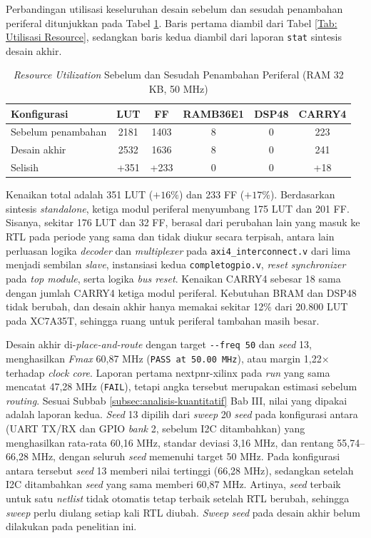 Perbandingan utilisasi keseluruhan desain sebelum dan sesudah penambahan periferal ditunjukkan pada Tabel \ref{Tab: Resource Sebelum Sesudah}. Baris pertama diambil dari Tabel \ref{Tab: Utilisasi Resource}, sedangkan baris kedua diambil dari laporan \texttt{stat} sintesis desain akhir.

\begin{table}[H]
	\centering
	\begin{tabular}{|l|c|c|c|c|c|}
		\hline
		\textbf{Konfigurasi} & \textbf{LUT} & \textbf{FF} & \textbf{RAMB36E1} & \textbf{DSP48} & \textbf{CARRY4} \\
		\hline
		Sebelum penambahan & 2181 & 1403 & 8 & 0 & 223 \\ \hline
		Desain akhir & 2532 & 1636 & 8 & 0 & 241 \\ \hline
		Selisih & +351 & +233 & 0 & 0 & +18 \\ \hline
	\end{tabular}
	\vspace{0.5em}
	\caption{\textit{Resource Utilization} Sebelum dan Sesudah Penambahan Periferal (RAM 32 KB, 50 MHz)}
	\label{Tab: Resource Sebelum Sesudah}
\end{table}

Kenaikan total adalah 351 LUT ($+16\%$) dan 233 FF ($+17\%$). Berdasarkan sintesis \textit{standalone}, ketiga modul periferal menyumbang 175 LUT dan 201 FF. Sisanya, sekitar 176 LUT dan 32 FF, berasal dari perubahan lain yang masuk ke RTL pada periode yang sama dan tidak diukur secara terpisah, antara lain perluasan logika \textit{decoder} dan \textit{multiplexer} pada \texttt{axi4\_interconnect.v} dari lima menjadi sembilan \textit{slave}, instansiasi kedua \texttt{completogpio.v}, \textit{reset synchronizer} pada \textit{top module}, serta logika \textit{bus reset}. Kenaikan CARRY4 sebesar 18 sama dengan jumlah CARRY4 ketiga modul periferal. Kebutuhan BRAM dan DSP48 tidak berubah, dan desain akhir hanya memakai sekitar 12\% dari 20.800 LUT pada XC7A35T, sehingga ruang untuk periferal tambahan masih besar.

Desain akhir di-\textit{place-and-route} dengan target \texttt{-{}-freq 50} dan \textit{seed} 13, menghasilkan \textit{Fmax} 60,87 MHz (\texttt{PASS at 50.00 MHz}), atau margin 1,22$\times$ terhadap \textit{clock core}. Laporan pertama nextpnr-xilinx pada \textit{run} yang sama mencatat 47,28 MHz (\texttt{FAIL}), tetapi angka tersebut merupakan estimasi sebelum \textit{routing}. Sesuai Subbab \ref{subsec:analisis-kuantitatif} Bab III, nilai yang dipakai adalah laporan kedua. \textit{Seed} 13 dipilih dari \textit{sweep} 20 \textit{seed} pada konfigurasi antara (UART TX/RX dan GPIO \textit{bank} 2, sebelum I2C ditambahkan) yang menghasilkan rata-rata 60,16 MHz, standar deviasi 3,16 MHz, dan rentang 55,74--66,28 MHz, dengan seluruh \textit{seed} memenuhi target 50 MHz. Pada konfigurasi antara tersebut \textit{seed} 13 memberi nilai tertinggi (66,28 MHz), sedangkan setelah I2C ditambahkan \textit{seed} yang sama memberi 60,87 MHz. Artinya, \textit{seed} terbaik untuk satu \textit{netlist} tidak otomatis tetap terbaik setelah RTL berubah, sehingga \textit{sweep} perlu diulang setiap kali RTL diubah. \textit{Sweep} \textit{seed} pada desain akhir belum dilakukan pada penelitian ini.

